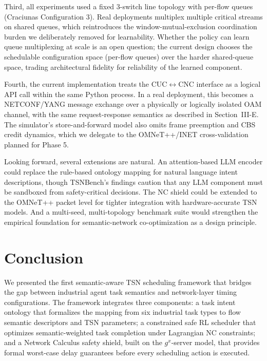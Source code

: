 \documentclass[conference]{IEEEtran}
\begin{document}
Third, all experiments used a fixed 3-switch line topology with per-flow queues (Craciunas Configuration 3). Real deployments multiplex multiple critical streams on shared queues, which reintroduces the window-mutual-exclusion coordination burden we deliberately removed for learnability. Whether the policy can learn queue multiplexing at scale is an open question; the current design chooses the schedulable configuration space (per-flow queues) over the harder shared-queue space, trading architectural fidelity for reliability of the learned component.

Fourth, the current implementation treats the CUC$\leftrightarrow$CNC interface as a logical API call within the same Python process. In a real deployment, this becomes a NETCONF/YANG message exchange over a physically or logically isolated OAM channel, with the same request-response semantics as described in Section~III-E. The simulator's store-and-forward model also omits frame preemption and CBS credit dynamics, which we delegate to the OMNeT++/INET cross-validation planned for Phase 5.

Looking forward, several extensions are natural. An attention-based LLM encoder could replace the rule-based ontology mapping for natural language intent descriptions, though TSNBench's findings caution that any LLM component must be sandboxed from safety-critical decisions. The NC shield could be extended to the OMNeT++ packet level for tighter integration with hardware-accurate TSN models. And a multi-seed, multi-topology benchmark suite would strengthen the empirical foundation for semantic-network co-optimization as a design principle.

\section{Conclusion}

We presented the first semantic-aware TSN scheduling framework that bridges the gap between industrial agent task semantics and network-layer timing configurations. The framework integrates three components: a task intent ontology that formalizes the mapping from six industrial task types to flow semantic descriptors and TSN parameters; a constrained safe RL scheduler that optimizes semantic-weighted task completion under Lagrangian NC constraints; and a Network Calculus safety shield, built on the $g^x$-server model, that provides formal worst-case delay guarantees before every scheduling action is executed.
\end{document}
